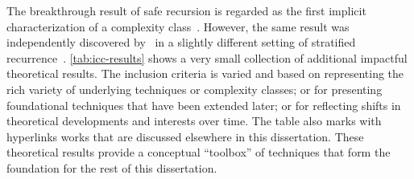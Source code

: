 The breakthrough result of safe recursion is regarded as the first implicit characterization of a complexity class~\cite{dallago2011,kristiansen2017,rubiano17}.
However, the same result was independently discovered by~\textcite{leivant1993} in a slightly different setting of stratified recurrence~\cite[p. 762]{dallago2022}.
\autoref{tab:icc-results} shows a {very small} collection of additional impactful theoretical results.
The inclusion criteria is varied and based on representing the rich variety of underlying techniques or complexity classes;
or for presenting foundational techniques that have been extended later;
or for reflecting shifts in theoretical developments and interests over time.
The table also marks with hyperlinks works that are discussed elsewhere in this dissertation.
These theoretical results provide a conceptual \enquote{toolbox} of techniques that form the foundation
for the rest of this dissertation.


